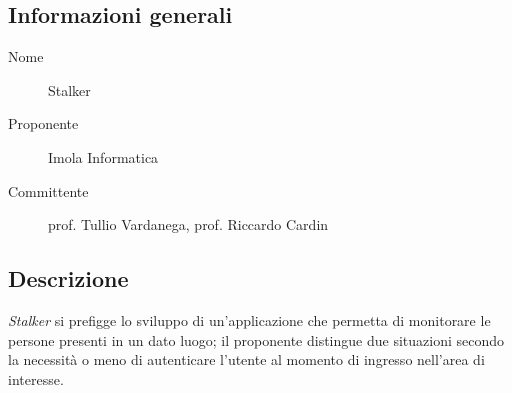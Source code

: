 \documentclass[../studio-di-fattibilita.tex]{subfiles}
\begin{document}
	\subsection{Informazioni generali}
	\label{subsec:informazioni_generali}
	\begin{description}
		\item[Nome] Stalker
		\item[Proponente] Imola Informatica
		\item[Committente] prof. Tullio Vardanega, prof. Riccardo Cardin
	\end{description}


	\subsection{Descrizione}
	\label{subsec:descrizione}
	\textit{Stalker} si prefigge lo sviluppo di un'applicazione che permetta di monitorare le persone presenti in un dato luogo; il proponente distingue due situazioni secondo la necessità o meno di autenticare l'utente al momento di ingresso nell'area di interesse.
\end{document}
